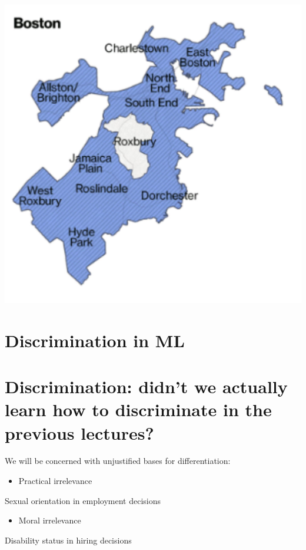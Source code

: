 \documentclass[10pt]{article}
\begin{document}
\begin{center}
\includegraphics[max width=\textwidth]{2024_01_08_7c1a383b1e6170f910e4g-05}
\end{center}

\section*{Discrimination in ML}
\section*{Discrimination: didn't we actually learn how to discriminate in the previous lectures?}
We will be concerned with unjustified bases for differentiation:

\begin{itemize}
  \item Practical irrelevance
\end{itemize}

Sexual orientation in employment decisions

\begin{itemize}
  \item Moral irrelevance
\end{itemize}

Disability status in hiring decisions
\end{document}
